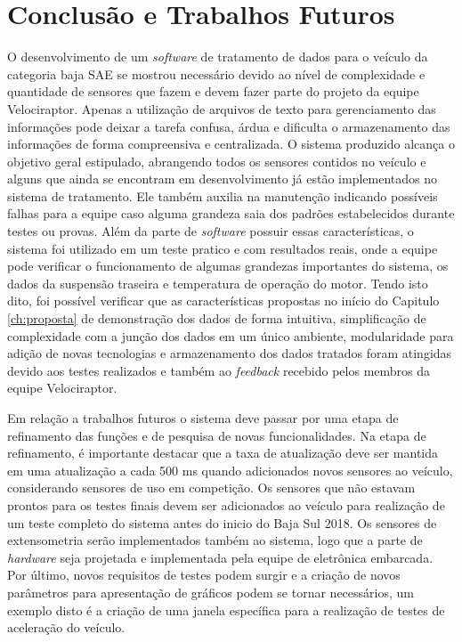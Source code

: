 \chapter{Conclusão e Trabalhos Futuros}
	\label{ch:consideracoes}
O desenvolvimento de um \textit{software} de tratamento de dados para o veículo da categoria baja SAE se mostrou necessário devido ao nível de complexidade e quantidade de sensores que fazem e devem fazer parte do projeto da equipe Velociraptor. Apenas a utilização de arquivos de texto para gerenciamento das informações pode deixar a tarefa confusa, árdua e dificulta o armazenamento das informações de forma compreensiva e centralizada. O sistema produzido alcança o objetivo geral estipulado, abrangendo todos os sensores contidos no veículo e alguns que ainda se encontram em desenvolvimento já estão implementados no sistema de tratamento. Ele também auxilia na manutenção indicando possíveis falhas para a equipe caso alguma grandeza saia dos padrões estabelecidos durante testes ou provas. Além da parte de \textit{software} possuir essas características, o sistema foi utilizado em um teste pratico e com resultados reais, onde a equipe pode verificar o funcionamento de algumas grandezas importantes do sistema, os dados da suspensão traseira e temperatura de operação do motor. Tendo isto dito, foi possível verificar que as características propostas no início do Capitulo \ref{ch:proposta} de demonstração dos dados de forma intuitiva, simplificação de complexidade com a junção dos dados em um único ambiente, modularidade para adição de novas tecnologias e armazenamento dos dados tratados foram atingidas devido aos testes realizados e também ao \textit{feedback} recebido pelos membros da equipe Velociraptor.


Em relação a trabalhos futuros o sistema deve passar por uma etapa de refinamento das funções e de pesquisa de novas funcionalidades. Na etapa de refinamento, é importante destacar que a taxa de atualização deve ser mantida em uma atualização a cada 500 ms quando adicionados novos sensores ao veículo, considerando sensores de uso em competição. Os sensores que não estavam prontos para os testes finais devem ser adicionados ao veículo para realização de um teste completo do sistema antes do inicio do Baja Sul 2018. Os sensores de extensometria serão implementados também ao sistema, logo que a parte de \textit{hardware} seja projetada e implementada pela equipe de eletrônica embarcada. Por último, novos requisitos de testes podem surgir e a criação de novos parâmetros para apresentação de gráficos podem se tornar necessários, um exemplo disto é a criação de uma janela específica para a realização de testes de aceleração do veículo.

